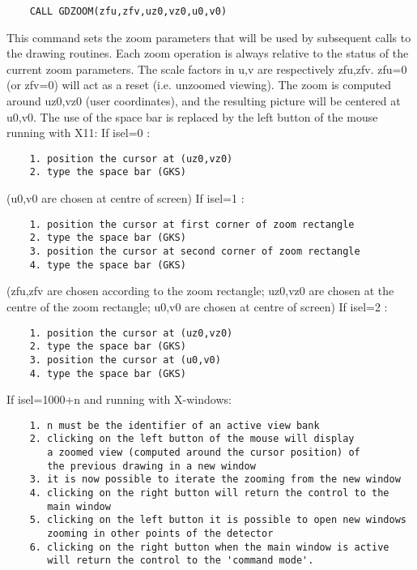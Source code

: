 \begin{verbatim}
    CALL GDZOOM(zfu,zfv,uz0,vz0,u0,v0)
\end{verbatim}
   \par
This command sets the zoom parameters that will be used by subsequent calls 
   to the drawing routines. Each zoom operation is always relative to the 
   status of the current zoom parameters.  The scale factors in u,v are 
   respectively  zfu,zfv.  zfu=0 (or zfv=0) will act as a reset (i.e. unzoomed 
   viewing).  The zoom is computed around uz0,vz0 (user coordinates), and the 
   resulting picture will be centered at u0,v0.  The use of the space bar is 
   replaced by the left button of the mouse running with X11:  If isel=0 :  
\begin{verbatim}
    1. position the cursor at (uz0,vz0)
    2. type the space bar (GKS)
\end{verbatim}
   \par
(u0,v0 are chosen at centre of screen) If isel=1 :  
\begin{verbatim}
    1. position the cursor at first corner of zoom rectangle
    2. type the space bar (GKS)
    3. position the cursor at second corner of zoom rectangle
    4. type the space bar (GKS)
\end{verbatim}
   \par
(zfu,zfv are chosen according to the zoom rectangle; uz0,vz0 are chosen at 
   the centre of the zoom rectangle; u0,v0 are chosen at centre of screen) If 
   isel=2 :  
\begin{verbatim}
    1. position the cursor at (uz0,vz0)
    2. type the space bar (GKS)
    3. position the cursor at (u0,v0)
    4. type the space bar (GKS)
\end{verbatim}
   \par
If isel=1000+n and running with X-windows:  
\begin{verbatim}
    1. n must be the identifier of an active view bank
    2. clicking on the left button of the mouse will display
       a zoomed view (computed around the cursor position) of
       the previous drawing in a new window
    3. it is now possible to iterate the zooming from the new window
    4. clicking on the right button will return the control to the
       main window
    5. clicking on the left button it is possible to open new windows
       zooming in other points of the detector
    6. clicking on the right button when the main window is active
       will return the control to the 'command mode'.
\end{verbatim}

